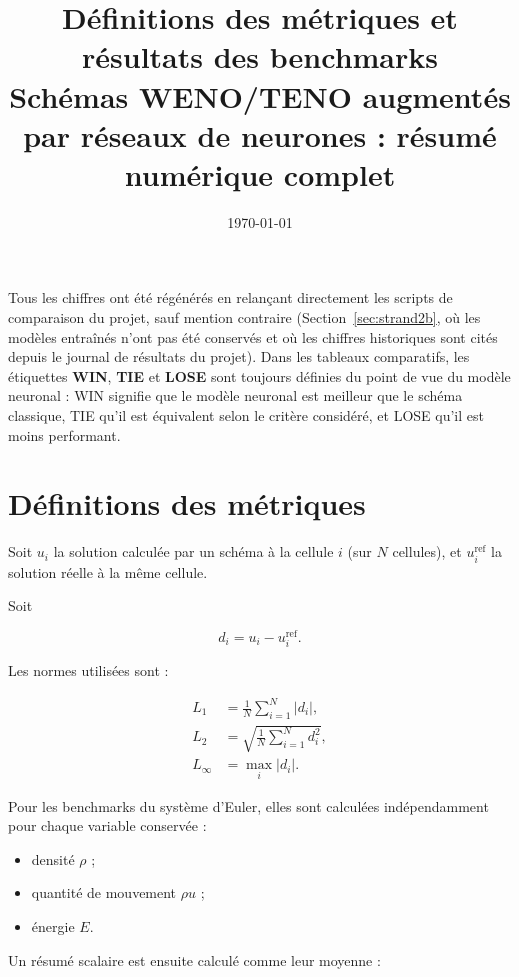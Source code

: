 \documentclass[11pt]{article}
\title{
Définitions des métriques et résultats des benchmarks\\
\large
Schémas WENO/TENO augmentés par réseaux de neurones :
résumé numérique complet
}
\author{}
\date{\today}
\begin{document}
\maketitle

\noindent
Tous les chiffres ont été régénérés en relançant directement les scripts
de comparaison du projet, sauf mention contraire
(Section~\ref{sec:strand2b}, où les modèles entraînés n'ont pas été
conservés et où les chiffres historiques sont cités depuis le journal de
résultats du projet).
Dans les tableaux comparatifs, les étiquettes
\textbf{WIN}, \textbf{TIE} et \textbf{LOSE}
sont toujours définies du point de vue du modèle neuronal :
WIN signifie que le modèle neuronal est meilleur que le schéma classique,
TIE qu'il est équivalent selon le critère considéré,
et LOSE qu'il est moins performant.


\section{Définitions des métriques}
\label{sec:metrics}

Soit $u_i$ la solution calculée par un schéma à la cellule $i$
(sur $N$ cellules), et $u_i^{\text{ref}}$ la solution réelle à la même
cellule.

Soit

\[
d_i = u_i-u_i^{\text{ref}}.
\]

Les normes utilisées sont :

\begin{align}
L_1
&=
\frac{1}{N}
\sum_{i=1}^{N}
|d_i|,
\\
L_2
&=
\sqrt{
\frac{1}{N}
\sum_{i=1}^{N}
d_i^2
},
\\
L_\infty
&=
\max_i |d_i|.
\end{align}

Pour les benchmarks du système d'Euler, elles sont calculées
indépendamment pour chaque variable conservée :

\begin{itemize}
    \item densité $\rho$ ;
    \item quantité de mouvement $\rho u$ ;
    \item énergie $E$.
\end{itemize}

Un résumé scalaire est ensuite calculé comme leur moyenne :
\end{document}
